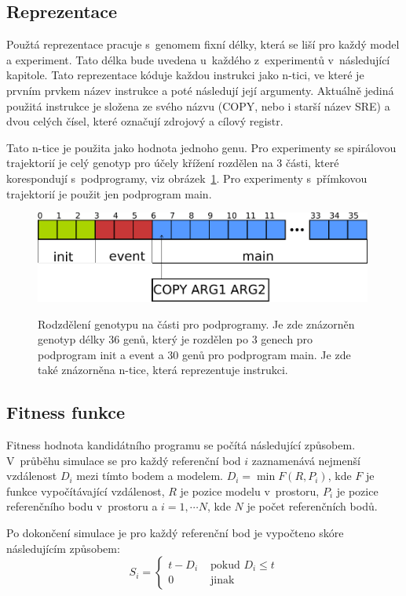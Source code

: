 \subsection{Reprezentace}
Použtá reprezentace pracuje s~genomem fixní délky, která se liší pro každý model a experiment.
Tato délka bude uvedena u~každého z~experimentů v~následující kapitole.
Tato reprezentace kóduje každou instrukci jako n-tici, ve které je prvním prvkem název instrukce a poté následují její argumenty.
Aktuálně jediná použitá instrukce je složena ze svého názvu (COPY, nebo i starší název SRE) a dvou celých čísel, které označují zdrojový a cílový registr.

Tato n-tice je použita jako hodnota jednoho genu.
Pro experimenty se spirálovou trajektorií je celý genotyp pro účely křížení rozdělen na 3 části, které korespondují s~podprogramy, viz obrázek~\ref{fig:genotyp}.
Pro experimenty s~přímkovou trajektorií je použit jen podprogram main.

\begin{figure}[h]
    \centering
    {\includegraphics[width=30em]{obrazky/genotyp.pdf}}
    \caption[Rodzdělení genotypu na části pro podprogramy]{
    Rodzdělení genotypu na části pro podprogramy.
    Je zde znázorněn genotyp délky 36 genů, který je rozdělen po 3 genech pro podprogram init a event a 30 genů pro podprogram main.
    Je zde také znázorněna n-tice, která reprezentuje instrukci.
    }
    \label{fig:genotyp}
\end{figure}


\subsection{Fitness funkce}
Fitness hodnota kandidátního programu se počítá následující způsobem.
V~průběhu simulace se pro každý referenční bod $i$ zaznamenává nejmenší vzdálenost $D_i$ mezi tímto bodem a modelem.
$D_i = \min{F(R, P_i)}$, kde $F$ je funkce vypočítávající vzdálenost, $R$ je pozice modelu v~prostoru, $P_i$ je pozice referenčního bodu v~prostoru a $i=1, \cdots N$, kde $N$ je počet referenčních bodů.

Po dokončení simulace je pro každý referenční bod je vypočteno skóre následujícím způsobem:
$$S_i=\left\{\begin{matrix}
                 t - D_i&\mbox{ pokud }D_{i}\leq t\\ 0 &\mbox{ jinak }
\end{matrix}\right.$$

